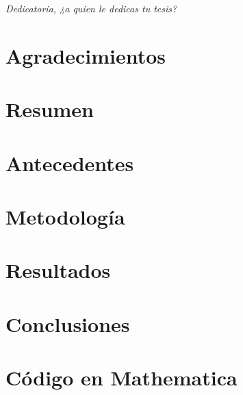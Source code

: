 \documentclass[12pt]{report}
\begin{document}


\tableofcontents 


\listoffigures%



\listoftables 


\chapter*{}
\begin{flushright}
\textit{Dedicatoria, ¿a quien le dedicas tu tesis?}
\end{flushright}



\chapter*{Agradecimientos}


\chapter*{Resumen}


\chapter{Antecedentes}



\chapter{Metodología}


\chapter{Resultados}


\chapter{Conclusiones}


\appendix
\chapter{Código en Mathematica}





\end{document}
